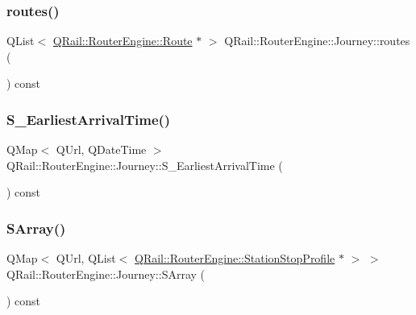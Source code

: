 \mbox{\label{classQRail_1_1RouterEngine_1_1Journey_ac1ead02119493cf91dc47f867034108e}} 
\subsubsection{\texorpdfstring{routes()}{routes()}}
{\footnotesize\ttfamily Q\+List$<$ \mbox{\hyperlink{classQRail_1_1RouterEngine_1_1Route}{Q\+Rail\+::\+Router\+Engine\+::\+Route}} $\ast$ $>$ Q\+Rail\+::\+Router\+Engine\+::\+Journey\+::routes (\begin{DoxyParamCaption}{ }\end{DoxyParamCaption}) const}

\mbox{\label{classQRail_1_1RouterEngine_1_1Journey_a7fe25d3e03ff906868d6892b80008041}} 
\subsubsection{\texorpdfstring{S\_EarliestArrivalTime()}{S\_EarliestArrivalTime()}}
{\footnotesize\ttfamily Q\+Map$<$ Q\+Url, Q\+Date\+Time $>$ Q\+Rail\+::\+Router\+Engine\+::\+Journey\+::\+S\+\_\+\+Earliest\+Arrival\+Time (\begin{DoxyParamCaption}{ }\end{DoxyParamCaption}) const}

\mbox{\label{classQRail_1_1RouterEngine_1_1Journey_a737847fba5cb96e84825dc5b28f4e8f2}} 
\subsubsection{\texorpdfstring{SArray()}{SArray()}}
{\footnotesize\ttfamily Q\+Map$<$ Q\+Url, Q\+List$<$ \mbox{\hyperlink{classQRail_1_1RouterEngine_1_1StationStopProfile}{Q\+Rail\+::\+Router\+Engine\+::\+Station\+Stop\+Profile}} $\ast$ $>$ $>$ Q\+Rail\+::\+Router\+Engine\+::\+Journey\+::\+S\+Array (\begin{DoxyParamCaption}{ }\end{DoxyParamCaption}) const}

